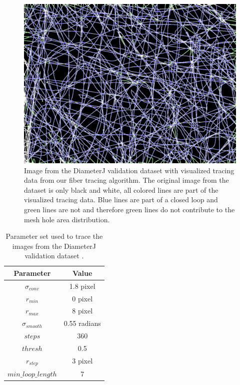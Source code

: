 \documentclass[12pt,english,twocolumn]{revtex4}
\begin{document}
\begin{figure}[t]
	\includegraphics[width=\linewidth]{illustrations/diaj_traced.png}
	\caption{Image from the DiameterJ validation dataset \cite{diaj_dataset} with visualized tracing data from our fiber tracing algorithm. The original image from the dataset is only black and white, all colored lines are part of the visualized tracing data. Blue lines are part of a closed loop and green lines are not and therefore green lines do not contribute to the mesh hole area distribution.}
	\label{fig:diaj_traced}
\end{figure}
\begin{table}[h!]
\centering
\caption{Parameter set used to trace the images from the DiameterJ validation dataset \cite{diaj_dataset}.}
\label{tab:parameters_diaj}
\begin{tabular}{c|c}
	Parameter & Value\\
	\hline
	$\sigma_{conv}$ & 1.8 pixel\\
	$r_{min}$ & 0 pixel\\
	$r_{max}$ & 8 pixel\\
	$\sigma_{smooth}$ & 0.55 radians\\
	$steps$ & 360\\
	$thresh$ & 0.5\\
	$r_{step}$ & 3 pixel\\
	$min\_loop\_length$ & 7\\
\end{tabular}
\end{table}
\end{document}
